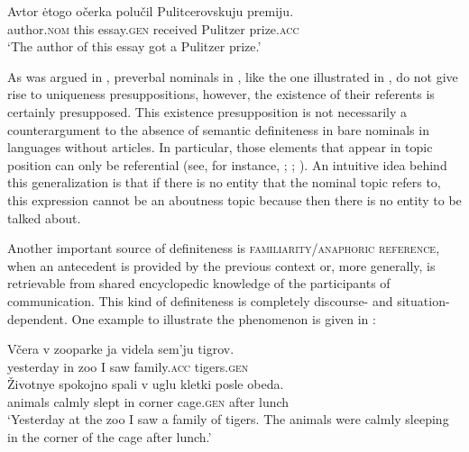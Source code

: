 \documentclass[output=paper,
colorlinks,
citecolor=brown,
newtxmath
]{langscibook}
\begin{document}
\ea \label{ex:seres:32}
\gll	Avtor				ėtogo		očerka		polučil		Pulitcerovskuju	premiju. \\
       	author.\textsc{nom} 	this		essay.\textsc{gen} 	received 	Pulitzer 				prize.\textsc{acc}\\
       	\glt `The author of this essay got a Pulitzer prize.'
    \z

\noindent As was argued in , preverbal nominals in , like the one illustrated in , do not give rise to uniqueness presuppositions, however, the existence of their referents is certainly presupposed. This existence presupposition
is not necessarily a counterargument to the absence of semantic definiteness in bare nominals in languages without articles. In particular, those elements that appear in topic position can only be referential (see, for instance, \citealt{Reinhart1981}; \citealt{Erteschik-Shir1998}; \citealt{Endriss2009}). An intuitive idea behind this generalization is that if there is no entity that the nominal topic refers to, this expression cannot be an aboutness topic because then there is no entity to be talked about. %

Another important source of definiteness is \textsc{familiarity/anaphoric reference}, when an antecedent is provided by the previous context or, more generally, is retrievable from shared encyclopedic knowledge of the participants of communication.
This kind of definiteness is completely discourse- and situation-dependent. One example to illustrate the phenomenon is given in :

\ea \label{ex:seres:33}
\gll	Včera			v	zooparke	ja	videla	sem'ju		tigrov.\\
	yesterday	in	zoo          	I	saw		family.\textsc{acc}	tigers.\textsc{gen}\\
	\gll Životnye	spokojno	spali	v	uglu		kletki			posle	obeda.\\
	animals		calmly      	slept	in	corner	cage.\textsc{gen} 	after	lunch\\
\glt `Yesterday at the zoo I saw a family of tigers. The animals were calmly sleeping in the corner of the cage after lunch.'
\z
\end{document}
